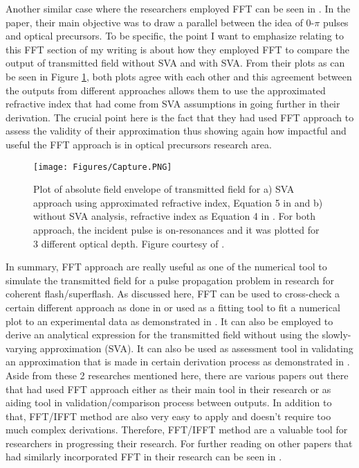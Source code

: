 Another similar case where the researchers employed FFT can be seen in \cite{Jeong2008}. In the paper, their main objective was to draw a parallel between the idea of 0-$\pi$ pulses and optical precursors. To be specific, the point I want to emphasize relating to this FFT section of my writing is about how they employed FFT to compare the output of transmitted field without SVA and with SVA. From their plots as can be seen in Figure \ref{fig: svafft}, both plots agree with each other and this agreement between the outputs from different approaches allows them to use the approximated refractive index that had come from SVA assumptions in going further in their derivation. The crucial point here is the fact that they had used FFT approach to assess the validity of their approximation thus showing again how impactful and useful the FFT approach is in optical precursors research area.

\begin{figure}
    \centering
    \texttt{[image: Figures/Capture.PNG]}
    \caption[Plot of Transmitted Field With and Without SVA]{Plot of absolute field envelope of transmitted field for a) SVA approach using approximated refractive index, Equation 5 in \protect\cite{Jeong2008} and b) without SVA analysis, refractive index as Equation 4 in \protect\cite{Jeong2008}. For both approach, the incident pulse is on-resonances and it was plotted for 3 different optical depth. Figure courtesy of \protect\cite{Jeong2008}.}
    \label{fig: svafft}
\end{figure}

In summary, FFT approach are really useful as one of the numerical tool to simulate the transmitted field for a pulse propagation problem in research for coherent flash/superflash. As discussed here, FFT can be used to cross-check a certain different approach as done in \cite{jeong2010slow} or used as a fitting tool to fit a numerical plot to an experimental data as demonstrated in \cite{Chen2010}. It can also be employed to derive an analytical expression for the transmitted field without using the slowly-varying approximation (SVA). It can also be used as assessment tool in validating an approximation that is made in certain derivation process as demonstrated in \cite{Jeong2008}. Aside from these 2 researches mentioned here, there are various papers out there that had used FFT approach either as their main tool in their research or as aiding tool in validation/comparison process between outputs. In addition to that, FFT/IFFT method are also very easy to apply and doesn't require too much complex derivations. Therefore, FFT/IFFT method are a valuable tool for researchers in progressing their research. For further reading on other papers that had similarly incorporated FFT in their research can be seen in \cite{Jeong2019, jeong2010slow, Chen2010, Macke2015, Oughstun2010, Wei2009, MacKe2009}.
